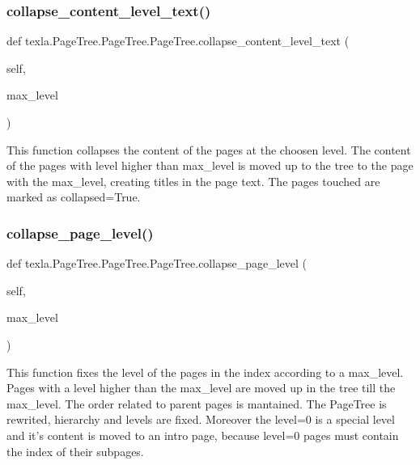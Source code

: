 \subsubsection{\texorpdfstring{collapse\+\_\+content\+\_\+level\+\_\+text()}{collapse\_content\_level\_text()}}
{\footnotesize\ttfamily def texla.\+Page\+Tree.\+Page\+Tree.\+Page\+Tree.\+collapse\+\_\+content\+\_\+level\+\_\+text (\begin{DoxyParamCaption}\item[{}]{self,  }\item[{}]{max\+\_\+level }\end{DoxyParamCaption})}

\begin{DoxyVerb}This function collapses the content
of the pages at the choosen level. The content
of the pages with level higher than max_level
is moved up to the tree to the page with the max_level,
creating titles in the page text. The pages touched
are marked as collapsed=True.\end{DoxyVerb}
 \hypertarget{classtexla_1_1PageTree_1_1PageTree_1_1PageTree_aad58c1721ddcdd1e6e3ba7ad0248b4d7}{}\label{classtexla_1_1PageTree_1_1PageTree_1_1PageTree_aad58c1721ddcdd1e6e3ba7ad0248b4d7} 
\subsubsection{\texorpdfstring{collapse\+\_\+page\+\_\+level()}{collapse\_page\_level()}}
{\footnotesize\ttfamily def texla.\+Page\+Tree.\+Page\+Tree.\+Page\+Tree.\+collapse\+\_\+page\+\_\+level (\begin{DoxyParamCaption}\item[{}]{self,  }\item[{}]{max\+\_\+level }\end{DoxyParamCaption})}

\begin{DoxyVerb}This function fixes the level of the pages
in the index according to a max_level.
Pages with a level higher than the max_level are moved
up in the tree till the max_level. The order related
to parent pages is mantained. The PageTree is rewrited,
hierarchy and levels are fixed.
Moreover the level=0 is a special level and it's content
is moved to an intro page, because level=0 pages must
contain the index of their subpages.
\end{DoxyVerb}
 \hypertarget{classtexla_1_1PageTree_1_1PageTree_1_1PageTree_ae913f178f121266966856b75dde090f4}{}\label{classtexla_1_1PageTree_1_1PageTree_1_1PageTree_ae913f178f121266966856b75dde090f4} 
